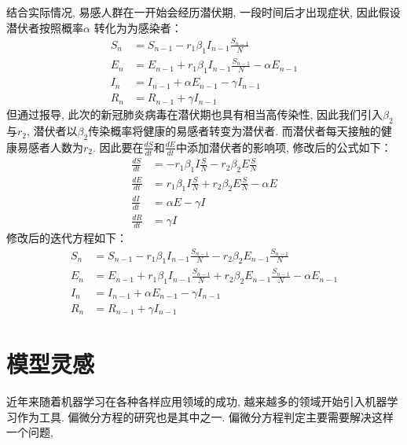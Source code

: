 \documentclass[lang=cn,11pt]{elegantpaper}
\begin{document}
结合实际情况, 易感人群在一开始会经历潜伏期, 一段时间后才出现症状, 因此假设潜伏者按照概率$\alpha$ 转化为为感染者：
\begin{equation}
\begin{aligned}
S_n&=S_{n-1}-r_1\beta_1 I_{n-1}\frac{S_{n-1}}{N} \\
E_n&=E_{n-1}+r_1\beta_1 I_{n-1}\frac{S_{n-1}}{N} - \alpha E_{n-1} \\ I_n&=I_{n-1}+\alpha E_{n-1}-\gamma I_{n-1}\\
R_n&=R_{n-1}+\gamma I_{n-1}
\end{aligned}
\end{equation}
但通过报导, 此次的新冠肺炎病毒在潜伏期也具有相当高传染性, 因此我们引入$\beta _2$与$r_2$, 潜伏者以$\beta_2$传染概率将健康的易感者转变为潜伏者. 而潜伏者每天接触的健康易感者人数为$r_2$. 因此要在$\frac{dS}{dt}$和$\frac{dE}{dt}$中添加潜伏者的影响项, 修改后的公式如下：
\begin{equation}
\begin{aligned}
\frac{dS}{d t}&=-r_1\beta_1 I\frac{S}{N}-r_2\beta _2E\frac{S}{N} \\
\frac{dE}{d t}&=r_1\beta_1 I\frac{S}{N}+r_2\beta _2E\frac{S}{N}-\alpha E\\
\frac{dI}{d t}&=\alpha E-\gamma I\\
\frac{dR}{d t}&=\gamma I
\end{aligned}
\end{equation}
修改后的迭代方程如下：
\begin{equation}
\begin{aligned}
S_n&=S_{n-1}-r_1\beta_1 I_{n-1}\frac{S_{n-1}}{N}-r_2\beta _2E_{n-1}\frac{S_{n-1}}{N} \\
E_n&=E_{n-1}+r_1\beta_1 I_{n-1}\frac{S_{n-1}}{N}+r_2\beta_2E_{n-1}\frac{S_{n-1}}{N}-\alpha E_{n-1} \\
I_n&=I_{n-1}+\alpha E_{n-1}-\gamma I_{n-1}\\
R_n&=R_{n-1}+\gamma I_{n-1}	
\end{aligned}
\end{equation}






\section{模型灵感}

近年来随着机器学习在各种各样应用领域的成功, 越来越多的领域开始引入机器学习作为工具. 偏微分方程的研究也是其中之一. 偏微分方程判定主要需要解决这样一个问题, 
\end{document}
